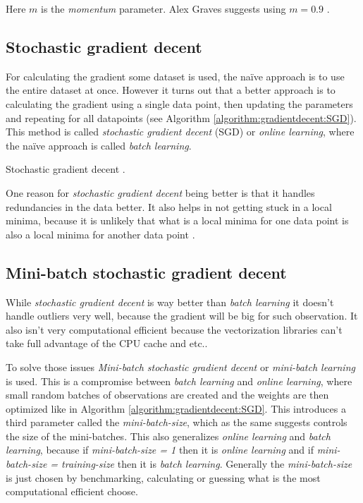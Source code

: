 Here $m$ is the \textit{momentum} parameter. Alex Graves suggests using $m = 0.9$ \cite{alexgraves}.

\subsection{Stochastic gradient decent}

For calculating the gradient some dataset is used, the naïve approach is to use the entire dataset at once. However it turns out that a better approach is to calculating the gradient using a single data point, then updating the parameters and repeating for all datapoints (see Algorithm \ref{algorithm:gradientdecent:SGD}). This method is called \textit{stochastic gradient decent} (SGD) or \textit{online learning}, where the naïve approach is called \textit{batch learning}.

\begin{algorithm}[h]
 \DontPrintSemicolon
 \caption{Stochastic gradient decent \cite{alexgraves}.}
 \label{algorithm:gradientdecent:SGD}
\end{algorithm}

One reason for \textit{stochastic gradient decent} being better is that it handles redundancies in the data better. It also helps in not getting stuck in a local minima, because it is unlikely that what is a local minima for one data point is also a local minima for another data point \cite{bishop}.

\subsection{Mini-batch stochastic gradient decent}

While \textit{stochastic gradient decent} is way better than \textit{batch learning} it doesn't handle outliers very well, because the gradient will be big for such observation. It also isn't very computational efficient because the vectorization libraries can't take full advantage of the CPU cache and etc..

To solve those issues \textit{Mini-batch stochastic gradient decent} or \textit{mini-batch learning} is used. This is a compromise between \textit{batch learning} and \textit{online learning}, where small random batches of observations are created and the weights are then optimized like in Algorithm \ref{algorithm:gradientdecent:SGD}. This introduces a third parameter called the \textit{mini-batch-size}, which as the same suggests controls the size of the mini-batches. This also generalizes \textit{online learning} and \textit{batch learning}, because if \textit{mini-batch-size = 1} then it is \textit{online learning} and if \textit{mini-batch-size = training-size} then it is \textit{batch learning}. Generally the \textit{mini-batch-size} is just chosen by benchmarking, calculating or guessing what is the most computational efficient choose.

